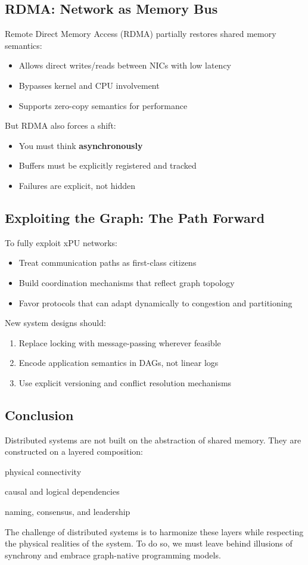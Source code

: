 \subsection*{RDMA: Network as Memory Bus}
Remote Direct Memory Access (RDMA) partially restores shared memory semantics:
\begin{itemize}[noitemsep]
  \item Allows direct writes/reads between NICs with low latency
  \item Bypasses kernel and CPU involvement
  \item Supports zero-copy semantics for performance
\end{itemize}

But RDMA also forces a shift:
\begin{itemize}[noitemsep]
  \item You must think \textbf{asynchronously}
  \item Buffers must be explicitly registered and tracked
  \item Failures are explicit, not hidden
\end{itemize}

\subsection{Exploiting the Graph: The Path Forward}
To fully exploit xPU networks:
\begin{itemize}
  \item Treat communication paths as first-class citizens
  \item Build coordination mechanisms that reflect graph topology
  \item Favor protocols that can adapt dynamically to congestion and partitioning
\end{itemize}

New system designs should:
\begin{enumerate}
  \item Replace locking with message-passing wherever feasible
  \item Encode application semantics in DAGs, not linear logs
  \item Use explicit versioning and conflict resolution mechanisms
\end{enumerate}

\subsection{Conclusion}
Distributed systems are not built on the abstraction of shared memory. They are constructed on a layered composition:
\begin{description}[style=unboxed,leftmargin=0cm]
  \item[Graphs:] physical connectivity
  \item[DAGs:] causal and logical dependencies
  \item[Trees:] naming, consensus, and leadership
\end{description}

The challenge of distributed systems is to harmonize these layers while respecting the physical realities of the system. To do so, we must leave behind illusions of synchrony and embrace graph-native programming models.